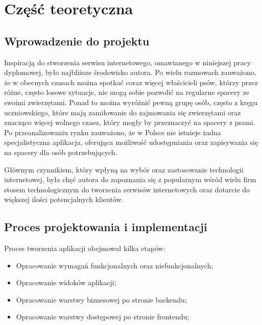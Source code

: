 \chapter{Część teoretyczna}
\section{Wprowadzenie do projektu}
Inspiracją do stworzenia serwisu internetowego, omawianego w niniejszej pracy dyplomowej, było najbliższe środowisko autora. Po wielu rozmowach zauważono, że w obecnych czasach można spotkać coraz więcej właścicieli psów, którzy przez różne, często losowe sytuacje, nie mogą sobie pozwolić na regularne spacery ze swoimi zwierzętami. Ponad to można wyróżnić pewną grupę osób, często z kręgu uczniowskiego, które mają zamiłowanie do zajmowania się zwierzętami oraz znacząco więcej wolnego czasu, który mogły by przeznaczyć na spacery z psami. Po przeanalizowaniu rynku zauważono, że w Polsce nie istnieje żadna specjalistyczna aplikacja, oferująca możliwość udostępniania oraz zapisywania się na spacery dla osób potrzebujących.

Głównym czynnikiem, który wpłyną na wybór oraz zastosowanie technologii internetowej, była chęć autora do zapoznania się z popularnym wśród wielu firm stosem technologicznym do tworzenia serwisów internetowych oraz dotarcie do większej ilości potencjalnych klientów.

\section{Proces projektowania i implementacji}
Proces tworzenia aplikacji obejmował kilka etapów:
\begin{itemize}[leftmargin=1cm]
    \item Opracowanie wymagań funkcjonalnych oraz niefunkcjonalnych;
    \item Opracowanie widoków aplikacji;
    \item Opracowanie warstwy biznesowej po stronie backendu;
    \item Opracowanie warstwy dostępowej po stronie frontendu;
\end{itemize}

